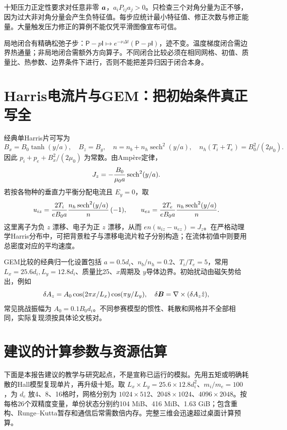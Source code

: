 十矩压力正定性要求对任意非零 $\bm{a}$，$a_iP_{ij}a_j>0$。只检查三个对角分量为正不够，因为过大非对角分量会产生负特征值。每步应统计最小特征值、修正次数与修正能量。大量触发压力修正的算例不能仅凭平滑图像宣布可信。

局地闭合有精确松弛子步：$\mathsf P-p\mathsf I\mapsto e^{-\nu\Delta t}(\mathsf P-p\mathsf I)$，迹不变。温度梯度闭合需边界热通量；非局地闭合需额外方向算子。不同闭合比较必须在相同网格、初值、质量比、热参数、边界条件下进行，否则不能把差异归因于闭合本身。\citep{Wang2015,Ng2020,Ng2017,Closure2026}

\section{Harris电流片与GEM：把初始条件真正写全}
经典单Harris片可写为
\begin{equation}B_x=B_0\tanh(y/a),\quad B_z=B_g,\quad
n=n_b+n_h\operatorname{sech}^2(y/a),\quad
n_h(T_i+T_e)=B_0^2/(2\mu_0).
\end{equation}
因此 $p_i+p_e+B_x^2/(2\mu_0)$ 为常数。由Ampère定律，
\begin{equation}J_z=-{B_0\over\mu_0a}\operatorname{sech}^2(y/a).
\end{equation}
若按各物种的垂直力平衡分配电流且 $E_y=0$，取
\begin{equation}u_{iz}={2T_i\over eB_0a}{n_h\operatorname{sech}^2(y/a)\over n}\,(-1),\qquad
u_{ez}={2T_e\over eB_0a}{n_h\operatorname{sech}^2(y/a)\over n}.
\end{equation}
这里离子为负 $z$ 漂移、电子为正 $z$ 漂移，从而 $en(u_{iz}-u_{ez})=J_z$。在严格动理学Harris分布中，可把背景粒子与漂移电流片粒子分别构造；在流体初值中则要用总密度对应的平均速度。

GEM比较的经典归一化设置包括 $a=0.5d_i$、$n_b/n_h=0.2$、$T_i/T_e=5$，常用 $L_x=25.6d_i,L_y=12.8d_i$、质量比25、$x$周期及 $y$导体边界。初始扰动由磁矢势给出，例如
\begin{equation}\delta A_z=A_0\cos(2\pi x/L_x)\cos(\pi y/L_y),\quad \delta\bm{B}=\nabla\times(\delta A_z\hat z),
\end{equation}
常见挑战振幅为 $A_0=0.1B_0d_i$。不同参赛模型的惯性、耗散和网格并不全部相同，实际复现须按具体论文核对。\citep{Birn2001}


\section{建议的计算参数与资源估算}
下面是本报告建议的教学与研究起点，不是宣称已运行的模拟。先用五矩或明确耗散的Hall模型复现单片，再升级十矩。取 $L_x\times L_y=25.6\times12.8d_i^2$、$m_i/m_e=100$，为 $d_e$ 放4、8、16格时，网格分别为 $1024\times512$、$2048\times1024$、$4096\times2048$。按每格26个双精度变量，单份状态分别约104 MiB、416 MiB、1.63 GiB；包含重构、Runge--Kutta暂存和通信后常需数倍内存。完整三维会迅速超过桌面计算预算。

